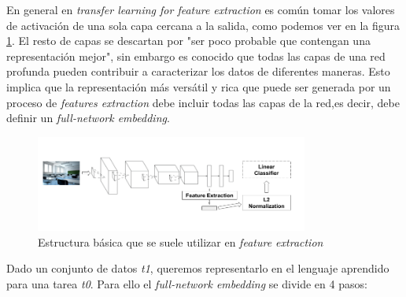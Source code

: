 \documentclass[12,twoside]{TFG-GM}
\theoremstyle{definition}
\theoremstyle{remark}
\begin{document}
En general en \textit{transfer learning for feature extraction} es común tomar los valores de activación de una sola capa cercana a la salida, como podemos ver en la figura \ref{fig:base}. El resto de capas se descartan por 
"ser poco probable que contengan una representación mejor"\cite{onlylastlayers}, sin embargo es conocido que todas las capas de una red profunda pueden contribuir a caracterizar los datos de diferentes maneras. Esto implica que la representación más versátil y rica que puede ser generada por un proceso de \textit{features extraction} debe incluir todas las capas de la red,es decir, debe definir un \textit{full-network embedding}. 
\begin{figure}[H]
\centering
\includegraphics[width = 0.8\textwidth]{Images/basecrop.png} 
\caption{Estructura básica que se suele utilizar en \textit{feature extraction}
\label{fig:base}}
\end{figure}
Dado un conjunto de datos \textit{t1}, queremos representarlo en el lenguaje aprendido para una tarea \textit{t0}. Para ello el \textit{full-network embedding} se divide en 4 pasos: 
\end{document}

